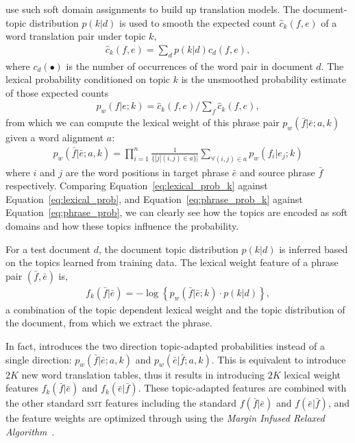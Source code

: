 \citet{Eidelman-12} use such soft domain assignments to build up
translation models. The document-topic distribution $p(k|d)$ is used
to smooth the expected count $\hat{c}_{k}(f,e)$ of a word translation
pair under topic $k$,
\begin{align}
\textstyle \hat{c}_{k}(f,e) = \sum_{d}{p(k|d)c_d(f,e)},
\end{align}
where $c_d(\bullet)$ is the number of occurrences of the word pair in
document $d$.  The lexical probability conditioned on topic $k$ is the
unsmoothed probability estimate of those expected counts
\begin{align}
\label{eq:lexical_prob_k}
\textstyle p_w(f|e;k) = \hat{c}_{k}(f,e) / \sum_f{\hat{c}_{k}(f,e)},
\end{align}
from which we can compute the lexical weight of this phrase pair
$p_w(\bar{f}|\bar{e};a, k)$ given a word alignment $a$\citep{koehn-03}:
\begin{align}
\label{eq:phrase_prob_k}
p_w(\bar{f} | \bar{e};a, k) = \prod^{n}_{i=1} \frac{1}{\{|j | (i, j) \in a\}|} \sum_{\forall (i,j) \in a} p_w(f_i | e_j; k)
\end{align}
where $i$ and $j$ are the word positions in target phrase $\bar{e}$
and source phrase $\bar{f}$ respectively. Comparing
Equation~\ref{eq:lexical_prob_k} against
Equation~\ref{eq:lexical_prob}, and Equation~\ref{eq:phrase_prob_k}
against Equation~\ref{eq:phrase_prob}, we can clearly see how the
topics are encoded as soft domains and how these topics influence the
probability.

For a test document $d$, the document topic distribution $p(k | d)$ is
inferred based on the topics learned from training data. The lexical
weight feature of a phrase pair $(\bar{f}, \bar{e})$ is,
\begin{align}
\textstyle f_{k}(\bar{f}|\bar{e})=-\log\left\{{p_{w}(\bar{f}|\bar{e};k)\cdot p(k|d)}\right\},
\end{align}
a combination of the topic dependent lexical weight and the topic
distribution of the document, from which we extract the phrase.

In fact, \citet{Eidelman-12} introduces the two direction
topic-adapted probabilities instead of a single direction:
$p_w(\bar{f} | \bar{e};a, k)$ and $p_w(\bar{e} | \bar{f};a, k)$. This
is equivalent to introduce $2K$ new word translation tables, thus it
results in introducing $2K$ lexical weight features
$f_{k}(\bar{f}|\bar{e})$ and $f_{k}(\bar{e}|\bar{f})$. These
topic-adapted features are combined with the other standard
\textsc{smt} features including the standard $f(\bar{f}|\bar{e})$ and
$f(\bar{e}|\bar{f})$, and the feature weights are optimized through
using the \emph{Margin Infused Relaxed
  Algorithm}~\cite[\textsc{mira}]{Crammer-06}.

